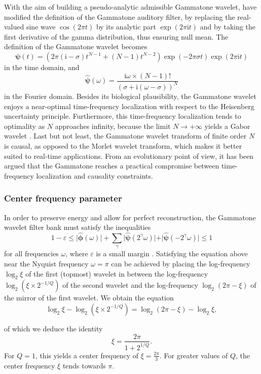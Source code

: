 \documentclass[smallextended]{svjour3}
\begin{document}
With the aim of building a pseudo-analytic admissible Gammatone wavelet,
\cite{Venkitaraman2014} have modified the definition of the Gammatone
auditory filter, by replacing the real-valued sine wave $\cos(2\pi t)$
by its analytic part $\exp(2\pi\mathrm{\mathrm{i}}t)$ and by taking
the first derivative of the gamma distribution, thus ensuring null
mean. The definition of the Gammatone wavelet becomes
\[
\boldsymbol{\psi}(t)=\left(2\pi(\mathrm{i}-\sigma)t^{N-1}+(N-1)t^{N-2}\right)\exp(-2\pi\sigma t)\exp(2\pi\mathrm{i}t)
\]
in the time domain, and
\[
\boldsymbol{\widehat{\psi}}(\omega)=\dfrac{\mathrm{i}\omega\times(N-1)!}{(\sigma+\mathrm{i}(\omega-\sigma))^{N}}
\]
in the Fourier domain. Besides its biological plausibility, the Gammatone
wavelet enjoys a near-optimal time-frequency localization with respect
to the Heisenberg uncertainty principle. Furthermore, this time-frequency
localization tends to optimality as $N$ approaches infinity, because
the limit $N\rightarrow+\infty$ yields a Gabor wavelet \cite{Cohen1995}.
Last but not least, the Gammatone wavelet transform of finite order
$N$ is causal, as opposed to the Morlet wavelet transform, which
makes it better suited to real-time applications. From an evolutionary
point of view, it has been argued that the Gammatone reaches a practical
compromise between time-frequency localization and causality constraints.


\subsubsection*{Center frequency parameter}

In order to preserve energy and allow for perfect reconstruction,
the Gammatone wavelet filter bank must satisfy the inequalities
\[
1-\varepsilon\leq\vert\boldsymbol{\hat{\phi}}(\omega)\vert+\sum_{\gamma}\vert\boldsymbol{\hat{\psi}}(2^{\gamma}\omega)\vert+\vert\boldsymbol{\hat{\psi}}(-2^{\gamma}\omega)\vert\leq1
\]
for all frequencies $\omega$, where $\varepsilon$ is a small margin
\cite{Anden2014}. Satisfying the equation above near the Nyquist
frequency $\omega=\pi$ can be achieved by placing the log-frequency
$\log_{2}\xi$ of the first (topmost) wavelet in between the log-frequency
$\log_{2}(\xi\times2^{-1/Q})$ of the second wavelet and the log-frequency
$\log_{2}(2\pi-\xi)$ of the mirror of the first wavelet. We obtain
the equation 
\[
\log_{2}\xi-\log_{2}(\xi\times2^{-1/Q})=\log_{2}(2\pi-\xi)-\log_{2}\xi,
\]

of which we deduce the identity
\[
\xi=\dfrac{2\pi}{1+2^{1/Q}}.
\]
For $Q=1$, this yields a center frequency of $\xi=\frac{2\pi}{3}$.
For greater values of $Q$, the center frequency $\xi$ tends towards
$\pi$.
\end{document}

